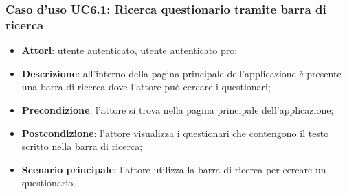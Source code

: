 \subsubsection{Caso d'uso UC6.1: Ricerca questionario tramite barra di ricerca}
\label{UC6.1}
\begin{itemize}
\item\textbf{Attori}: utente autenticato, utente autenticato pro;
\item\textbf{Descrizione}: all'interno della pagina principale dell'applicazione è presente una barra di ricerca dove l'attore può cercare i questionari;
\item\textbf{Precondizione}: l'attore si trova nella pagina principale dell'applicazione;
\item\textbf{Postcondizione}: l'attore visualizza i questionari che contengono il testo scritto nella barra di ricerca;
\item\textbf{Scenario principale}: l'attore utilizza la barra di ricerca per cercare un questionario.
\end{itemize}

